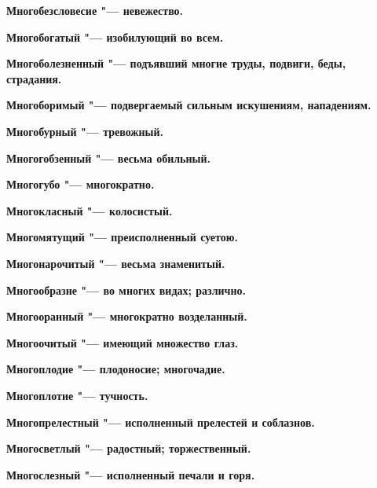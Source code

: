 \begin{mymulticols}{2}
\bfseries Многобезсловесие\normalfont{} "--- невежество. 




\bfseries Многобогатый\normalfont{} "--- изобилующий во всем. 




\bfseries Многоболезненный\normalfont{} "--- подъявший многие труды, подвиги, беды, страдания. 




\bfseries Многоборимый\normalfont{} "--- подвергаемый сильным искушениям, нападениям. 




\bfseries Многобурный\normalfont{} "--- тревожный. 




\bfseries Многогобзенный\normalfont{} "--- весьма обильный. 




\bfseries Многогубо\normalfont{} "--- многократно. 




\bfseries Многокласный\normalfont{} "--- колосистый. 




\bfseries Многомятущий\normalfont{} "--- преисполненный суетою. 




\bfseries Многонарочитый\normalfont{} "--- весьма знаменитый. 




\bfseries Многообразне\normalfont{} "--- во многих видах; различно. 




\bfseries Многооранный\normalfont{} "--- многократно возделанный. 




\bfseries Многоочитый\normalfont{} "--- имеющий множество глаз. 




\bfseries Многоплодие\normalfont{} "--- плодоносие; многочадие. 




\bfseries Многоплотие\normalfont{} "--- тучность. 




\bfseries Многопрелестный\normalfont{} "--- исполненный прелестей и соблазнов. 




\bfseries Многосветлый\normalfont{} "--- радостный; торжественный. 




\bfseries Многослезный\normalfont{} "--- исполненный печали и горя. 





\end{mymulticols}
